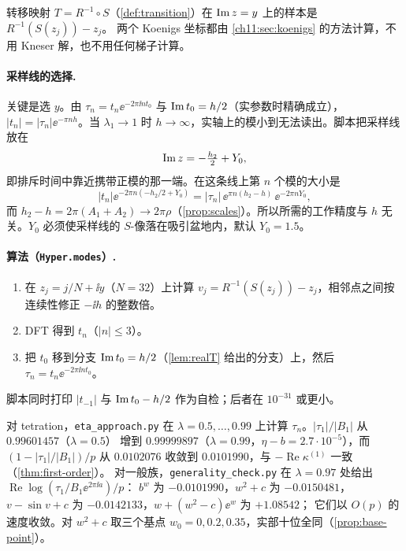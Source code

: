 转移映射 $T=R^{-1}\circ S$（\cref{def:transition}）在 $\operatorname{Im} z=y$ 上的样本是 $R^{-1}(S(z_j))-z_j$。
两个 Koenigs 坐标都由 \cref{ch11:sec:koenigs} 的方法计算，不用 Kneser 解，也不用任何梯子计算。

\paragraph{采样线的选择.} 关键是选 $y$。由 $\tau_n=t_n\ee^{-2\pi\ii nt_0}$ 与 $\operatorname{Im} t_0=h/2$（实参数时精确成立），
$|t_n|=|\tau_n|\ee^{-\pi nh}$。当 $\lambda_1\to1$ 时 $h\to\infty$，实轴上的模小到无法读出。脚本把采样线放在
\[
 \operatorname{Im} z=-\tfrac{h_2}2+Y_0 ,
\]
即排斥时间中靠近携带正模的那一端。在这条线上第 $n$ 个模的大小是
\[
 |t_n|\ee^{-2\pi n(-h_2/2+Y_0)}=|\tau_n|\,\ee^{\pi n(h_2-h)}\,\ee^{-2\pi nY_0},
\]
而 $h_2-h=2\pi(A_1+A_2)\to2\pi\rho$（\cref{prop:scales}）。所以所需的工作精度与 $h$ 无关。$Y_0$ 必须使采样线的 $S$-像落在吸引盆地内，默认 $Y_0=1.5$。

\paragraph{算法（\texttt{Hyper.modes}）.}
\begin{enumerate}
\item 在 $z_j=j/N+\ii y$（$N=32$）上计算 $v_j=R^{-1}(S(z_j))-z_j$，相邻点之间按连续性修正 $-\ii h$ 的整数倍。
\item DFT 得到 $t_n$（$|n|\le3$）。
\item 把 $t_0$ 移到分支 $\operatorname{Im} t_0=h/2$（\cref{lem:realT} 给出的分支）上，然后 $\tau_n=t_n\ee^{-2\pi\ii nt_0}$。
\end{enumerate}
脚本同时打印 $|t_{-1}|$ 与 $\operatorname{Im} t_0-h/2$ 作为自检；后者在 $10^{-31}$ 或更小\cite{KneserPaper}。

\begin{example}[向抛物极限逼近]\label{ch11:ex:eta-approach}
对 tetration，\texttt{eta\_\allowbreak{}approach.py} 在 $\lambda=0.5,\dots,0.99$ 上计算 $\tau_n$。$|\tau_1|/|B_1|$ 从 $0.99601457$（$\lambda=0.5$）
增到 $0.99999897$（$\lambda=0.99$，$\eta-b=2.7\cdot10^{-5}$），而 $(1-|\tau_1|/|B_1|)/p$ 从 $0.0102076$ 收敛到 $0.0101990$，与 $-\operatorname{Re}\kappa^{(1)}$ 一致（\cref{thm:first-order}）。
对一般族，\texttt{generality\_\allowbreak{}check.py} 在 $\lambda=0.97$ 处给出 $\operatorname{Re}\log(\tau_1/B_1\ee^{2\pi\ii a})/p$：
$b^w$ 为 $-0.0101990$，$w^2+c$ 为 $-0.0150481$，$v-\sin v+c$ 为 $-0.0142133$，$w+(w^2-c)\ee^w$ 为 $+1.08542$；
它们以 $O(p)$ 的速度收敛\cite{KneserPaper}。对 $w^2+c$ 取三个基点 $w_0=0,0.2,0.35$，实部十位全同（\cref{prop:base-point}）。
\end{example}

